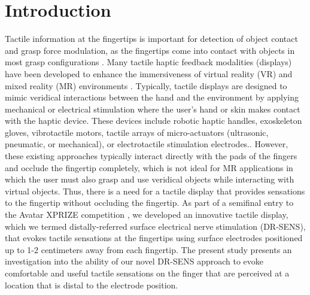 \documentclass[10pt]{iopart}
\begin{document}
\section{Introduction}
Tactile information at the fingertips is important for detection of object contact and grasp force modulation, as the fingertips come into contact with objects in most grasp configurations \cite{johansson_coding_2009}. Many tactile haptic feedback modalities (displays) have been developed to enhance the immersiveness of virtual reality (VR) and mixed reality (MR) environments \cite{wang_haptic_2019}. Typically, tactile displays are designed to mimic veridical interactions between the hand and the environment by applying mechanical or electrical stimulation where the user's hand or skin makes contact with the haptic device. These devices include robotic haptic handles, exoskeleton gloves, vibrotactile motors, tactile arrays of micro-actuators (ultrasonic, pneumatic, or mechanical), or electrotactile stimulation electrodes.\cite{ma_rml_2015, manus_prime_nodate, haptx_haptic_nodate, akifieva_teslasuit_2019, hayden_these_2022}. However, these existing approaches typically interact directly with the pads of the fingers and occlude the fingertip completely, which is not ideal for MR applications in which the user must also grasp and use veridical objects while interacting with virtual objects. Thus, there is a need for a tactile display that provides sensations to the fingertip without occluding the fingertip. As part of a semifinal entry to the Avatar XPRIZE competition \cite{zhangoperator}, we developed an innovative tactile display, which we termed distally-referred surface electrical nerve stimulation (DR-SENS), that evokes tactile sensations at the fingertips using surface electrodes positioned up to 1-2 centimeters away from each fingertip. The present study presents an investigation into the ability of our novel DR-SENS approach to evoke comfortable and useful tactile sensations on the finger that are perceived at a location that is distal to the electrode position. 
\end{document}

